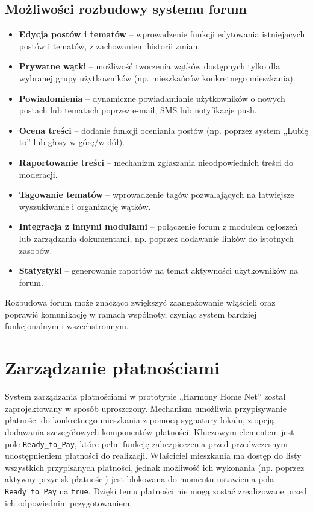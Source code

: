 \subsection{Możliwości rozbudowy systemu forum}
\begin{itemize}
    \item \textbf{Edycja postów i tematów} -- wprowadzenie funkcji edytowania istniejących postów i tematów, z zachowaniem historii zmian.
    \item \textbf{Prywatne wątki} -- możliwość tworzenia wątków dostępnych tylko dla wybranej grupy użytkowników (np. mieszkańców konkretnego mieszkania).
    \item \textbf{Powiadomienia} -- dynamiczne powiadamianie użytkowników o nowych postach lub tematach poprzez e-mail, SMS lub notyfikacje push.
    \item \textbf{Ocena treści} -- dodanie funkcji oceniania postów (np. poprzez system „Lubię to” lub głosy w górę/w dół).
    \item \textbf{Raportowanie treści} -- mechanizm zgłaszania nieodpowiednich treści do moderacji.
    \item \textbf{Tagowanie tematów} -- wprowadzenie tagów pozwalających na łatwiejsze wyszukiwanie i organizację wątków.
    \item \textbf{Integracja z innymi modułami} -- połączenie forum z modułem ogłoszeń lub zarządzania dokumentami, np. poprzez dodawanie linków do istotnych zasobów.
    \item \textbf{Statystyki} -- generowanie raportów na temat aktywności użytkowników na forum.
\end{itemize}

Rozbudowa forum może znacząco zwiększyć zaangażowanie włąścieli oraz poprawić komunikację w ramach wspólnoty, czyniąc system bardziej funkcjonalnym i wszechstronnym.

\section{Zarządzanie płatnościami}

System zarządzania płatnościami w prototypie „Harmony Home Net” został zaprojektowany w sposób uproszczony. Mechanizm umożliwia przypisywanie płatności do konkretnego mieszkania z pomocą sygnatury lokalu, z opcją dodawania szczegółowych komponentów płatności. Kluczowym elementem jest pole \texttt{Ready\_to\_Pay}, które pełni funkcję zabezpieczenia przed przedwczesnym udostępnieniem płatności do realizacji. Właściciel mieszkania ma dostęp do listy wszystkich przypisanych płatności, jednak możliwość ich wykonania (np. poprzez aktywny przycisk płatności) jest blokowana do momentu ustawienia pola \texttt{Ready\_to\_Pay} na \texttt{true}. Dzięki temu płatności nie mogą zostać zrealizowane przed ich odpowiednim przygotowaniem.

